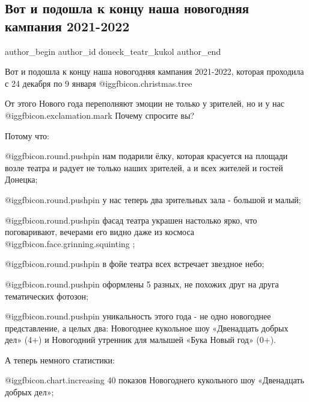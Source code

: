  
 
 
 
 
\subsection{Вот и подошла к концу наша новогодняя кампания 2021-2022}
\label{sec:10_01_2022.vk.doneck_teatr_kukol.1.novgod_kampania}

\ifcmt
 author_begin
   author_id doneck_teatr_kukol
 author_end
\fi

Вот и подошла к концу наша новогодняя кампания 2021-2022, которая проходила с
24 декабря по 9 января  @igg{fbicon.christmas.tree} 

От этого Нового года переполняют эмоции не только у зрителей, но и у нас @igg{fbicon.exclamation.mark}
Почему спросите вы?

Потому что:

 @igg{fbicon.round.pushpin} нам подарили ёлку, которая красуется на площади возле театра и радует не
только наших зрителей, а и всех жителей и гостей Донецка;

 @igg{fbicon.round.pushpin} у нас теперь два зрительных зала - большой и малый;

 @igg{fbicon.round.pushpin} фасад театра украшен настолько ярко, что поговаривают, вечерами его видно
даже из космоса  @igg{fbicon.face.grinning.squinting} ;

 @igg{fbicon.round.pushpin} в фойе театра всех встречает звездное небо;

 @igg{fbicon.round.pushpin} оформлены 5 разных, не похожих друг на друга тематических фотозон;

 @igg{fbicon.round.pushpin} уникальность этого года - не одно новогоднее представление, а целых два:
Новогоднее кукольное шоу «Двенадцать добрых дел» (4+) и Новогодний утренник для
малышей «Бука Новый год» (0+).

А теперь немного статистики:

 @igg{fbicon.chart.increasing}  40 показов Новогоднего кукольного шоу «Двенадцать добрых дел»;

